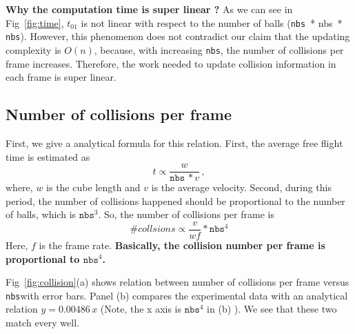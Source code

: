 \documentclass[twoside,11pt]{article}
\newcommand{\nbs}{\texttt{nbs}}
\begin{document}
\textbf{Why the computation time is super linear ?} 
As we can see in Fig~\ref{fig:time},  $t_{01}$ is not linear with respect
to the number of balls (\nbs\ * nbs\ * \nbs). However, this phenomenon 
does not contradict 
our claim that the updating complexity is $O(n)$, because, with increasing
\nbs, the number of collisions per frame increases. Therefore, the work
needed to update collision information in each frame is super linear. 



\subsection{Number of collisions per frame}
First, we give a analytical formula for this 
relation. First, the average free flight time is estimated as 
\begin{equation}
  \label{eq:1}
  t \propto \frac{w}{\nbs\, * v} \,,
\end{equation}
where, $w$ is the cube length and $v$ is the average velocity.
Second, during this period, the number of collisions happened should 
be proportional to the number of balls, which is $\nbs^3$. So, the 
number of collisions per frame is 
\begin{equation}
  \label{eq:2}
  \# collsions \propto \frac{v}{wf} * \nbs^4
\end{equation}
Here, $f$ is the frame rate. 
\textbf{Basically, the collision number per frame is
proportional to $\nbs^4$.}

Fig~\ref{fig:collision}(a) shows relation between number of collisions 
per frame versus \nbs with error bars. Panel (b) compares the experimental
data with an analytical relation $ y = 0.00486 \, x$ (Note, the x axis is
$\nbs^4$ in (b) ). We see that these two match every well.
\end{document}
